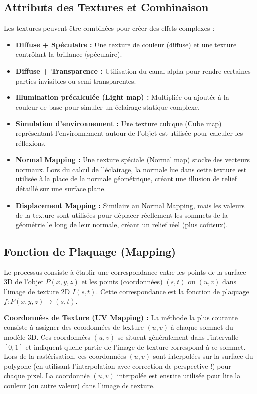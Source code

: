 \documentclass{article}
\begin{document}
\subsection{Attributs des Textures et Combinaison}
Les textures peuvent être combinées pour créer des effets complexes :
\begin{itemize}
    \item \textbf{Diffuse + Spéculaire :} Une texture de couleur (diffuse) et une texture contrôlant la brillance (spéculaire).
    \item \textbf{Diffuse + Transparence :} Utilisation du canal alpha pour rendre certaines parties invisibles ou semi-transparentes.
    \item \textbf{Illumination précalculée (Light map) :} Multipliée ou ajoutée à la couleur de base pour simuler un éclairage statique complexe.
    \item \textbf{Simulation d'environnement :} Une texture cubique (Cube map) représentant l'environnement autour de l'objet est utilisée pour calculer les réflexions.
    \item \textbf{Normal Mapping :} Une texture spéciale (Normal map) stocke des vecteurs normaux. Lors du calcul de l'éclairage, la normale lue dans cette texture est utilisée à la place de la normale géométrique, créant une illusion de relief détaillé sur une surface plane.
    \item \textbf{Displacement Mapping :} Similaire au Normal Mapping, mais les valeurs de la texture sont utilisées pour déplacer réellement les sommets de la géométrie le long de leur normale, créant un relief réel (plus coûteux).
\end{itemize}

\subsection{Fonction de Plaquage (Mapping)}
Le processus consiste à établir une correspondance entre les points de la surface 3D de l'objet $P(x, y, z)$ et les points (coordonnées) $(s, t)$ ou $(u, v)$ dans l'image de texture 2D $I(s, t)$. Cette correspondance est la fonction de plaquage $f: P(x, y, z) \rightarrow (s, t)$.

\textbf{Coordonnées de Texture (UV Mapping) :}
La méthode la plus courante consiste à assigner des coordonnées de texture $(u, v)$ à chaque sommet du modèle 3D. Ces coordonnées $(u, v)$ se situent généralement dans l'intervalle $[0, 1]$ et indiquent quelle partie de l'image de texture correspond à ce sommet.
Lors de la rastérisation, ces coordonnées $(u, v)$ sont interpolées sur la surface du polygone (en utilisant l'interpolation avec correction de perspective !) pour chaque pixel. La coordonnée $(u, v)$ interpolée est ensuite utilisée pour lire la couleur (ou autre valeur) dans l'image de texture.
\end{document}
